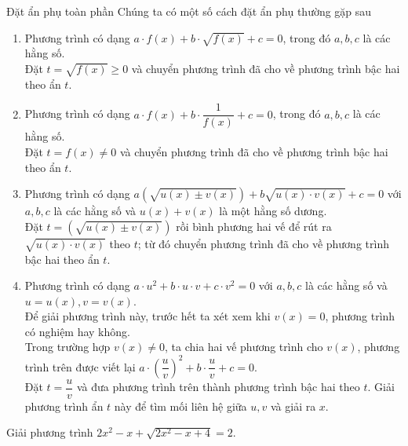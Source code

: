 \begin{dang}{Đặt ẩn phụ toàn phần}
	Chúng ta có một số cách đặt ẩn phụ thường gặp sau
	\begin{enumerate}
		\item Phương trình có dạng $a\cdot f(x)+b\cdot\sqrt{f(x)}+c=0$, trong đó $a, b, c$ là các hằng số.\\
		Đặt $t=\sqrt{f(x)}\geq 0$ và chuyển phương trình đã cho về phương trình bậc hai theo ẩn $t$.
		\item Phương trình có dạng $a\cdot f(x) + b\cdot \dfrac{1}{f(x)}+c=0$, trong đó $a, b, c$ là các hằng số.\\
		Đặt $t=f(x)\neq 0$ và chuyển phương trình đã cho về phương trình bậc hai theo ẩn $t$.
		\item Phương trình có dạng $a\left(\sqrt{u(x)\pm v(x)}\right) + b\sqrt{u(x)\cdot v(x)}+c=0$ với $a, b, c$ là các hằng số và $u(x)+v(x)$ là một hằng số dương.\\
		Đặt $t=\left(\sqrt{u(x)\pm v(x)}\right)$ rồi bình phương hai vế để rút ra $\sqrt{u(x)\cdot v(x)}$ theo $t$; từ đó chuyển phương trình đã cho về phương trình bậc hai theo ẩn $t$.
		\item Phương trình có dạng $a\cdot u^2+b\cdot u\cdot v + c\cdot v^2=0$ với $a, b, c$ là các hằng số và $u=u(x), v=v(x)$.\\
		Để giải phương trình này, trước hết ta xét xem khi $v(x)=0$, phương trình có nghiệm hay không.\\
		Trong trường hợp $v(x)\neq 0$, ta chia hai vế phương trình cho $v(x)$, phương trình trên được viết lại $a\cdot \left(\dfrac{u}{v}\right)^2+b\cdot \dfrac{u}{v}+c=0$.\\
		Đặt $t=\dfrac{u}{v}$ và đưa phương trình trên thành phương trình bậc hai theo $t$. Giải phương trình ẩn $t$ này để tìm mối liên hệ giữa $u, v$ và giải ra $x$.
	\end{enumerate}
\end{dang}
\begin{vd}%
	Giải phương trình $2x^2-x+\sqrt{2x^2-x+4}=2$.
\end{vd}


